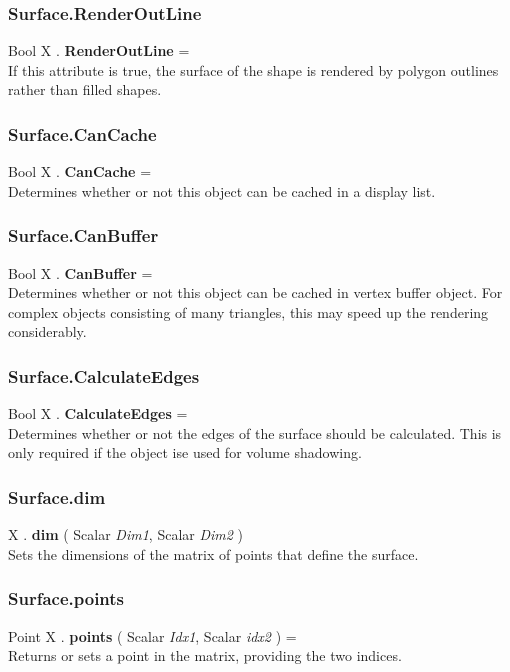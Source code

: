 \subsubsection{Surface.RenderOutLine \label{F:Surface:RenderOutLine}}
Bool X . \textbf{RenderOutLine} = \\
If this attribute is true, the surface of the shape is rendered by polygon outlines rather than filled shapes.

\subsubsection{Surface.CanCache \label{F:Surface:CanCache}}
Bool X . \textbf{CanCache} = \\
Determines whether or not this object can be cached in a display list.

\subsubsection{Surface.CanBuffer \label{F:Surface:CanBuffer}}
Bool X . \textbf{CanBuffer} = \\
Determines whether or not this object can be cached in vertex buffer object. For complex objects consisting of many triangles, this may speed up the rendering considerably.

\subsubsection{Surface.CalculateEdges \label{F:Surface:CalculateEdges}}
Bool X . \textbf{CalculateEdges} = \\
Determines whether or not the edges of the surface should be calculated. This is only required if the object ise used for volume shadowing.

\subsubsection{Surface.dim \label{F:Surface:dim}}
X . \textbf{dim} ( Scalar \textit{Dim1}, Scalar \textit{Dim2} ) \\
Sets the dimensions of the matrix of points that define the surface.

\subsubsection{Surface.points \label{F:Surface:points}}
Point X . \textbf{points} ( Scalar \textit{Idx1}, Scalar \textit{idx2} ) = \\
Returns or sets a point in the matrix, providing the two indices.

